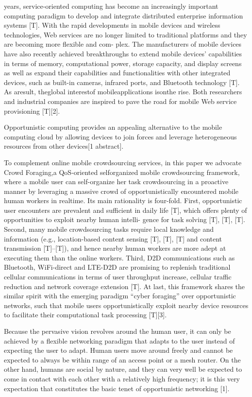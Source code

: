 \documentclass[10pt,journal,compsoc]{IEEEtran}
\begin{document}
 years, service-oriented computing has become an increasingly important computing paradigm to develop
and integrate distributed enterprise information systems [T]. With the rapid developments in mobile devices and wireless technologies, Web services are no longer limited to traditional platforms and they are becoming more flexible and com- plex. The manufacturers of mobile devices have also recently achieved breakthroughs to extend mobile devices’ capabilities in terms of memory, computational power, storage capacity, and display screens as well as expand their capabilities and functionalities with other integrated devices, such as built-in cameras, infrared ports, and Bluetooth technology [T]. As aresult, theglobal interestof mobileapplications isonthe rise. Both researchers and industrial companies are inspired to pave the road for mobile Web service provisioning [T][2].

Opportunistic computing provides an appealing alternative to the mobile computing cloud by allowing devices to join forces and leverage heterogeneous resources from other devices[1 abstract].

To complement online mobile crowdsourcing services, in this paper we advocate Crowd Foraging,a QoS-oriented selforganized mobile crowdsourcing framework, where a mobile user can self-organize her task crowdsourcing in a proactive manner by leveraging a massive crowd of opportunistically encountered mobile human workers in realtime. Its main rationality is four-fold. First, opportunistic user encounters are prevalent and sufficient in daily life [T], which offers plenty of opportunities to exploit nearby human intelli- gence for task solving [T], [T], [T]. Second, many mobile crowdsourcing tasks require local knowledge and information (e.g., location-based content sensing [T], [T], [T] and content transmission [T]–[T]), and hence nearby human workers are more adept at executing them than the online workers. Third, D2D communications such as Bluetooth, WiFi-direct and LTE-D2D are promising to replenish traditional cellular communications in terms of user throughput increase, cellular traffic reduction and network coverage extension [T]. At last, this framework shares the similar spirit with the emerging paradigm “cyber foraging” over opportunistic networks, such that mobile users opportunistically exploit nearby device resources to facilitate their computational task processing [T][3].

Because the pervasive vision revolves around the human user, it can only be achieved by a flexible networking paradigm that adapts to the user instead of expecting the user to adapt. Human users move around freely and cannot be expected to always be within range of an access point or a mesh router. On the other hand, humans are social by nature, and they can very well be expected to come in contact with each other with a relatively high frequency; it is this very expectation that constitutes the basic tenet of opportunistic networking [1].
\end{document}
